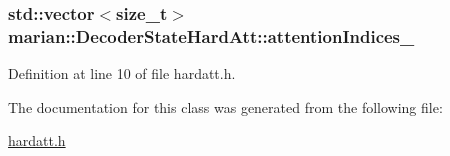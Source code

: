 \subsubsection[{\texorpdfstring{attention\+Indices\+\_\+}{attentionIndices_}}]{\setlength{\rightskip}{0pt plus 5cm}std\+::vector$<$size\+\_\+t$>$ marian\+::\+Decoder\+State\+Hard\+Att\+::attention\+Indices\+\_\+\hspace{0.3cm}{\ttfamily [protected]}}\hypertarget{classmarian_1_1DecoderStateHardAtt_a186190d2399d9182b076420fc7a98649}{}\label{classmarian_1_1DecoderStateHardAtt_a186190d2399d9182b076420fc7a98649}


Definition at line 10 of file hardatt.\+h.



The documentation for this class was generated from the following file\+:\begin{DoxyCompactItemize}
\item 
\hyperlink{hardatt_8h}{hardatt.\+h}\end{DoxyCompactItemize}
